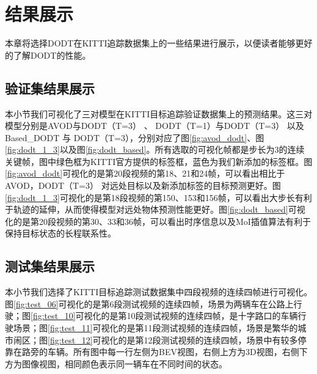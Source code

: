 
\chapter{结果展示}
\label{ch:results}

本章将选择DODT在KITTI追踪数据集上的一些结果进行展示，以便读者能够更好的了解DODT的性能。

\section{验证集结果展示}
\label{val_results}
本小节我们可视化了三对模型在KITTI目标追踪验证数据集上的预测结果。这三对模型分别是AVOD与DODT（T=3） 、 DODT（T=1）与DODT（T=3） 以及Based\_DODT 与 DODT（T=3），分别对应了图\ref{fig:avod_dodt}、图\ref{fig:dodt_1_3}以及图\ref{fig:dodt_based}。所有选取的可视化帧都是步长为3的连续关键帧，图中绿色框为KITTI官方提供的标签框，蓝色为我们新添加的标签框。图\ref{fig:avod_dodt}可视化的是第20段视频的第18、21和24帧，可以看出相比于AVOD，DODT（T=3） 对远处目标以及新添加标签的目标预测更好。图\ref{fig:dodt_1_3}可视化的是第18段视频的第150、153和156帧，可以看出大步长有利于轨迹的延伸，从而使得模型对远处物体预测性能更好。图\ref{fig:dodt_based}可视化的是第20段视频的第30、33和36帧，可以看出时序信息以及MoI插值算法有利于保持目标状态的长程联系性。




\section{测试集结果展示}
\label{test_results}

本小节我们选择了KITTI目标追踪测试数据集中四段视频的连续四帧进行可视化。图\ref{fig:test_06}可视化的是第6段测试视频的连续四帧，场景为两辆车在公路上行驶；图\ref{fig:test_10}可视化的是第10段测试视频的连续四帧，是十字路口的车辆行驶场景；图\ref{fig:test_11}可视化的是第11段测试视频的连续四帧，场景是繁华的城市闹区；图\ref{fig:test_12}可视化的是第12段测试视频的连续四帧，场景中有较多停靠在路旁的车辆。所有图中每一行左侧为BEV视图，右侧上方为3D视图，右侧下方为图像视图，相同颜色表示同一辆车在不同时间的状态。



\ifprint
	\newpage
	\thispagestyle{empty}
	\mbox{}
	
	\clearpage
	\setcounter{page}{10}
\fi
